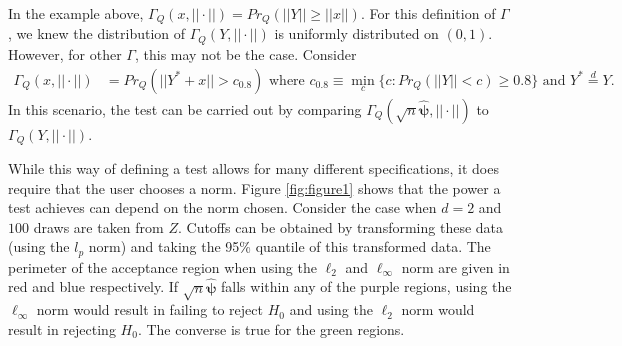 \documentclass{article}
\newcommand{\rvv}{Y}
\newcommand{\distv}{Q}
\begin{document}
In the example above, $\Gamma_\distv(x, ||\cdot||) = Pr_\distv\left(||\rvv|| \geq ||x|| \right)$.  For this definition of $\Gamma$, we knew the distribution of $\Gamma_\distv(\rvv, ||\cdot||)$ is uniformly distributed on $(0, 1)$.  However, for other $\Gamma$, this may not be the case. Consider 
\begin{align*}
	\Gamma_\distv(x, ||\cdot||) &= Pr_\distv(||\rvv^* + x|| > c_{0.8})  \text{ where }  c_{0.8} \equiv \min_{c}\{c : Pr_\distv(||\rvv|| < c) \geq 0.8 \} \text{ and } \rvv^* \overset{d}{=} \rvv.
\end{align*}
In this scenario, the test can be carried out by comparing $\Gamma_\distv(\sqrt{n}\hat{\boldsymbol{\psi}}, ||\cdot||)$ to $\Gamma_\distv(\rvv, ||\cdot||).$



While this way of defining a test allows for many different specifications, it does require that the user chooses a norm.  Figure \ref{fig:figure1} shows that the power a test achieves can depend on the norm chosen.  Consider the case when $d = 2$ and $100$ draws are taken from $Z$.  Cutoffs can be obtained by transforming these data (using the $l_p$ norm) and taking the 95\% quantile of this transformed data. The perimeter of the acceptance region when using the $\ell_2$ and $\ell_{\infty}$ norm are given in red and blue respectively. If $\sqrt{n}\hat{\boldsymbol{\psi}}$ falls within any of the purple regions, using the $\ell_\infty$ norm would result in failing to reject $H_0$ and using the $\ell_2$ norm would result in rejecting $H_0$.  The converse is true for the green regions.  
\end{document}
